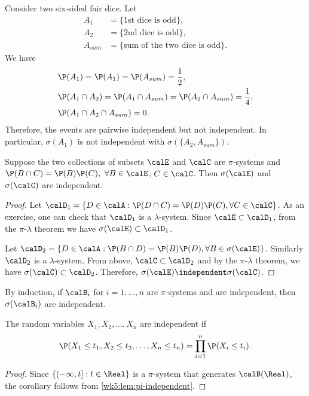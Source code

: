 \documentclass[../aipt.tex]{subfiles}
\begin{document}
\begin{Example}\label{wk5:Independence2}
Consider two six-sided fair dice. Let
\begin{align*}
A_1 & =\{ \text{1st dice is odd} \}, \\
A_2 & =\{ \text{2nd dice is odd} \},\\
A_{sum} & =\{ \text{sum of the two dice is odd} \}.
\end{align*}
We have
\begin{align*}
&\P (A_1) =\P (A_1) =\P (A_{sum}) =\frac{1}{2},\\
&\P (A_1\cap A_2) =\P (A_1\cap A_{sum})=\P (A_2\cap A_{sum}) =\frac{1}{4},\\
&\P (A_1\cap A_2 \cap A_{sum}) =0.
\end{align*}
Therefore, the events are pairwise independent but not independent. In particular, $\sigma(A_1)$ is not independent with $\sigma(\{A_2,A_{sum}\})$.
\end{Example}

\begin{Lemma}\label{wk5:lem:pi-independent} 
Suppose the two collections of subsets $\calE$ and $\calC$ are $\pi$-systems and $\P(B \cap C)=\P(B) \P (C),\ \forall B \in \calE$, $C \in \calC$. Then $\sigma (\calE)$ and $\sigma (\calC)$ are independent.
\end{Lemma}
\begin{proof}
Let $\calD_1=\{D \in \calA : \P (D\cap C)= \P(D) \P(C), \forall C \in \calC \}$. As an exercise, one can check that $\calD_1$ is a $\lambda$-system. Since $\calE \subset \calD_1$, from the $\pi$-$\lambda$ theorem we have $\sigma(\calE)\subset \calD_1$.

Let $\calD_2=\{D \in \calA : \P (B\cap D)= \P(B) \P(D), \forall B \in \sigma(\calE) \}$. Similarly $\calD_2$ is a $\lambda$-system. From above, $\calC \subset \calD_2$ and by the $\pi$-$\lambda$ theorem, we have $\sigma(\calC)\subset \calD_2$. Therefore, $\sigma (\calE) \independent \sigma (\calC)$.
\end{proof}
By induction, if $\calB_i$ for $i=1,\ldots,n$ are $\pi$-systems and are independent, then $\sigma(\calB _i)$ are independent.

\begin{Corollary}
The random variables $X_1,X_2,\ldots,X_n$ are independent if 
\begin{align*}
\P (X_1\leq t_1,X_2\leq t_2,\ldots, X_n\leq t_n)= \prod_{i=1}^n {\P(X_i\leq t_i)}.
\end{align*}
\end{Corollary}
\begin{proof}
Since $\{(-\infty,t]: t\in\Real\}$ is a $\pi$-system that generates $\calB(\Real)$, the corollary follows from \cref{wk5:lem:pi-independent}.
\end{proof}
\end{document}
